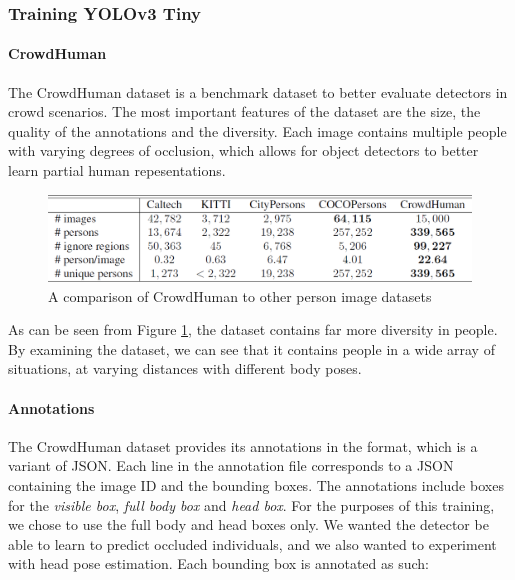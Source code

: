 \subsubsection{Training YOLOv3 Tiny}
\paragraph{CrowdHuman} The CrowdHuman dataset \cite{Shao} is a benchmark dataset to better evaluate detectors in crowd scenarios. The most important features of the dataset are the size, the quality of the annotations and the diversity. Each image contains multiple people with varying degrees of occlusion, which allows for object detectors to better learn partial human repesentations. 

\begin{figure}[ht]
	\centering
	\includegraphics[width=1.0\linewidth]{img/chapter5_implementation/crowdHumanStats.png}
	\caption{A comparison of CrowdHuman to other person image datasets \cite{Shao}}
	\label{fig:crowdHumanStats}
\end{figure}

As can be seen from Figure \ref{fig:crowdHumanStats}, the dataset contains far more diversity in people. By examining the dataset, we can see that it contains people in a wide array of situations, at varying distances with different body poses.

\paragraph{Annotations} The CrowdHuman dataset provides its annotations in the  format, which is a variant of JSON. Each line in the annotation file corresponds to a JSON containing the image ID and the bounding boxes. The annotations include boxes for the \textit{visible box}, \textit{full body box} and \textit{head box}. For the purposes of this training, we chose to use the full body and head boxes only. We wanted the detector be able to learn to predict occluded individuals, and we also wanted to experiment with head pose estimation. Each bounding box is annotated as such:

\paragraph{} 

